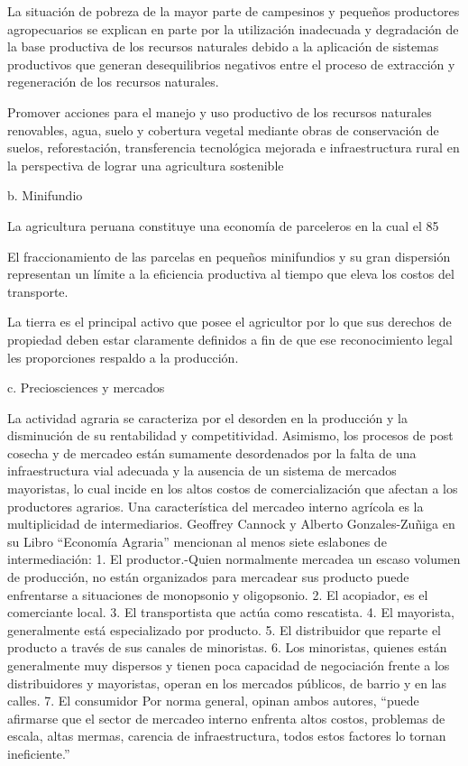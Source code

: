 \documentclass{report}
\begin{document}
La situación de pobreza de la mayor parte de campesinos y pequeños productores agropecuarios se explican en parte por la utilización inadecuada y degradación de la base productiva de los recursos naturales debido a la aplicación de sistemas productivos que generan desequilibrios negativos entre el proceso de extracción y regeneración de los recursos naturales.

Promover acciones para el manejo y uso productivo de los recursos naturales renovables, agua, suelo y cobertura vegetal mediante obras de conservación de suelos, reforestación, transferencia tecnológica mejorada e infraestructura rural en la perspectiva de lograr una agricultura sostenible

b. Minifundio

La agricultura peruana constituye una economía de parceleros en la cual el 85%

El fraccionamiento de las parcelas en pequeños minifundios y su gran dispersión representan un límite a la eficiencia productiva al tiempo que eleva los costos del transporte.

La tierra es el principal activo que posee el agricultor por lo que sus derechos
de propiedad deben estar claramente definidos a fin de que ese reconocimiento
legal les proporciones respaldo a la producción.

c. Preciosciences y mercados

La actividad agraria se caracteriza por el desorden en la producción y la disminución de su rentabilidad y competitividad. Asimismo, los procesos de post cosecha y de mercadeo están sumamente desordenados por la falta de una infraestructura vial adecuada y la ausencia de un sistema de mercados mayoristas, lo cual incide en los altos costos de comercialización que afectan a los productores agrarios.
Una característica del mercadeo interno agrícola es la multiplicidad de intermediarios. Geoffrey Cannock y Alberto Gonzales-Zuñiga en su Libro “Economía Agraria” mencionan al menos siete eslabones de intermediación:
1. El productor.-Quien normalmente mercadea un escaso volumen de producción, no están organizados para mercadear sus producto puede enfrentarse a situaciones de monopsonio y oligopsonio.
2. El acopiador, es el comerciante local.
3. El transportista que actúa como rescatista.
4. El mayorista, generalmente está especializado por producto.
5. El distribuidor que reparte el producto a través de sus canales de minoristas.
6. Los minoristas, quienes están generalmente muy dispersos y tienen poca capacidad de negociación frente a los distribuidores y mayoristas, operan en los mercados públicos, de barrio y en las calles.
7. El consumidor
Por norma general, opinan ambos autores, “puede afirmarse que el sector de mercadeo interno enfrenta altos costos, problemas de escala, altas mermas, carencia de infraestructura, todos estos factores lo tornan ineficiente.”
\end{document}
